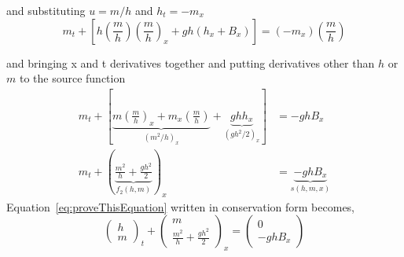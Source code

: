 \begin{description}
	and substituting $u=m/h$ and $h_t=-m_x$ 
	\begin{equation}
		m_t + [h \left(\frac{m}{h}\right) \left(\frac{m}{h}\right)_x + gh( h_x + B_x )] = (-m_x) \left(\frac{m}{h}\right) \label{eq:secondtoConservation} 
	\end{equation}
	
	and bringing x and t derivatives together and putting derivatives other than $h$ or $m$ to the source function 
	\begin{align}
		m_t + [\underbrace{m \left(\frac{m}{h}\right)_x + m_x \left(\frac{m}{h}\right)}_{(m^2/h)_x} + \underbrace{gh h_x}_{(gh^2/2)_x}] &= -gh B_x \label{eq:thirdConservation} \\
			m_t + (\underbrace{\frac{m^2}{h} + \frac{gh^2}{2}}_{f_2(h,m)})_x &= \underbrace{-gh B_x}_{s(h,m,x)}\label{eq:fourthConservation}
	\end{align} %
	Equation~\eqref{eq:proveThisEquation} written in conservation form becomes,
\begin{equation}
	\begin{pmatrix}
		h\\m 
	\end{pmatrix}
	_t + 
	\begin{pmatrix}
		m\\\frac{m^2}{h} + \frac{gh^2}{2} 
	\end{pmatrix}
	_x = 
	\begin{pmatrix}
		0\\ -g h B_x
	\end{pmatrix}
	\label{eq:proveThisEquationSolved}
\end{equation} %
\end{description}

